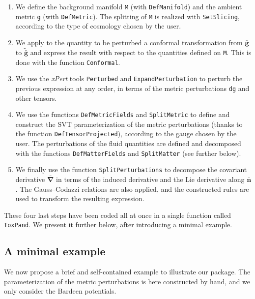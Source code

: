 \documentclass[notitlepage,onecolumn,floatfix,preprintnumbers,aps,prd,showpacs,nofootinbib,amsmath,amssymb,amsfonts]{revtex4-1}
\newcommand{\<}{\langle}
\renewcommand{\>}{\rangle}
\begin{document}
\begin{enumerate}
	\item[(i)] We define the background manifold {\tt M} (with {\tt DefManifold}) and the ambient metric {\tt g} (with {\tt DefMetric}). 
		The splitting of {\tt M} is realized with {\tt SetSlicing}, according to the type of cosmology chosen by the user. 
	\item[(ii)] We apply to the quantity to be perturbed a conformal transformation from $\bm{\bar g}$ to $\bm{\widetilde{\bar g}}$ 
		and express the result with respect to the quantities defined on {\tt M}. This is done with the function {\tt Conformal}. 
	\item[(iii)] We use the \textit{xPert} tools {\tt Perturbed} and {\tt ExpandPerturbation} to perturb the previous expression at any order, 
		in terms of the metric perturbations {\tt dg} and other tensors. 
	\item[(iv)] We use the functions {\tt DefMetricFields} and {\tt SplitMetric} to define and construct the SVT parameterization of the 
		metric perturbations (thanks to the function {\tt DefTensorProjected}), according to the gauge chosen by the user. 
		The perturbations of the fluid quantities are defined and decomposed with the functions {\tt DefMatterFields} and {\tt SplitMatter} 
		(see further below). 
	\item[(v)] We finally use the function {\tt  SplitPerturbations} to decompose the covariant derivative $\bm{\bar \nabla}$ in terms of 
		the induced derivative and the Lie derivative along $\bm{\bar n}$. The Gauss--Codazzi relations are also applied, and the 
		constructed rules are used to transform the resulting expression. 
\end{enumerate}

These four last steps have been coded all at once in a single function called {\tt ToxPand}. 
We present it further below, after introducing a minimal example. 

\subsection{A minimal example} \label{subsec:min_ex}

We now propose a brief and self-contained example to illustrate our package. 
The parameterization of the metric perturbations is here constructed by hand, and we only consider the Bardeen potentials. 
\end{document}
